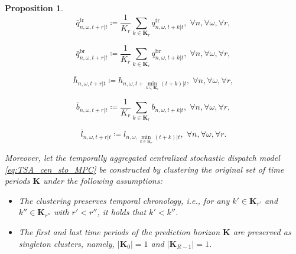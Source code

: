 \documentclass[10pt,a4paper]{amsart}
\newtheorem{proposition}{Proposition}
\begin{document}
\begin{proposition}
\noindent
\begin{minipage}{0.5\textwidth}
\begin{equation}\label{prop_agg_vars7}
\bar{q}^{\mathrm{tr}}_{n,\omega,t+r|t} \coloneqq
\frac{1}{K_r} \sum_{k \in \boldsymbol{K}_r}
q^{\mathrm{tr}}_{n,\omega,t+k|t},
\; \forall n, \forall \omega, \forall r,
\end{equation}
\end{minipage}%
\hfill
\begin{minipage}{0.5\textwidth}
\begin{equation}\label{prop_agg_vars8}
\bar{q}^{\mathrm{br}}_{n,\omega,t+r|t} \coloneqq
\frac{1}{K_r} \sum_{k \in \boldsymbol{K}_r}
q^{\mathrm{br}}_{n,\omega,t+k|t},
\; \forall n, \forall \omega, \forall r,
\end{equation}
\end{minipage}

\noindent
\begin{minipage}{0.5\textwidth}
\begin{equation}\label{prop_agg_vars9}
\bar{h}_{n,\omega,t+r|t} \coloneqq
h_{n,\omega,t+\min_{k \in \boldsymbol{K}_r}(t+k)|t},
\; \forall n, \forall \omega, \forall r,
\end{equation}
\end{minipage}%
\hfill
\begin{minipage}{0.5\textwidth}
\begin{equation}\label{prop_agg_vars10}
\bar{b}_{n,\omega,t+r|t} \coloneqq
\frac{1}{K_r} \sum_{k \in \boldsymbol{K}_r}
b_{n,\omega,t+k|t},
\; \forall n, \forall \omega, \forall r,
\end{equation}
\end{minipage}

\noindent
\begin{minipage}{0.5\textwidth}
\begin{equation}\label{prop_agg_vars11}
\bar{l}_{n,\omega,t+r|t} \coloneqq
l_{n,\omega, \min_{k \in \boldsymbol{K}_r}(t+k)|t},
\; \forall n, \forall \omega, \forall r.
\end{equation}
\end{minipage}%
\hfill
\begin{minipage}{0.5\textwidth}
\end{minipage}
\vspace{0.5cm}

Moreover, let the temporally aggregated centralized stochastic dispatch model \eqref{eq:TSA_cen_sto_MPC} be constructed by clustering the original set of time periods $\boldsymbol{K}$ under the following assumptions:
\begin{itemize}
\item[A1:] The clustering preserves temporal chronology,
i.e., for any $k' \in \boldsymbol{K}_{r'}$ and $k'' \in \boldsymbol{K}_{r''}$ with $r' < r''$, it holds that $k' < k''$.
\item[A2:] The first and last time periods of the prediction horizon $\boldsymbol{K}$ are preserved as singleton clusters, namely,
$|\boldsymbol{K}_0| = 1$ and
$|\boldsymbol{K}_{R-1}| = 1$.
\end{itemize}


\end{proposition}
\end{document}
